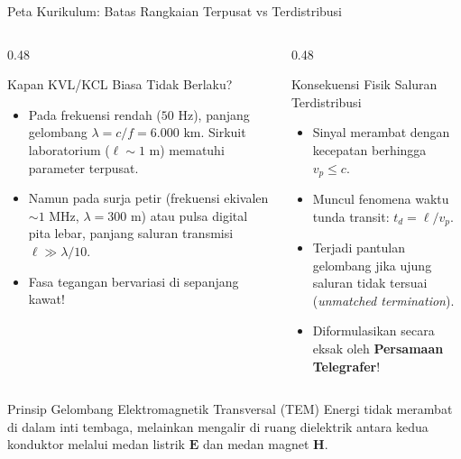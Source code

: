 \documentclass[aspectratio=169,10pt]{beamer}
\begin{document}
\begin{frame}{Peta Kurikulum: Batas Rangkaian Terpusat vs Terdistribusi}
  \begin{columns}[t]
    \begin{column}{0.48\textwidth}
      \begin{block}{Kapan KVL/KCL Biasa Tidak Berlaku?}
        \small
        \begin{itemize}
          \item Pada frekuensi rendah ($50\text{ Hz}$), panjang gelombang $\lambda = c/f = 6.000\text{ km}$. Sirkuit laboratorium ($\ell \sim 1\text{ m}$) mematuhi parameter terpusat.
          \item Namun pada surja petir (frekuensi ekivalen $\sim 1\text{ MHz}$, $\lambda = 300\text{ m}$) atau pulsa digital pita lebar, panjang saluran transmisi $\ell \gg \lambda / 10$.
          \item Fasa tegangan bervariasi di sepanjang kawat!
        \end{itemize}
      \end{block}
    \end{column}
    \begin{column}{0.48\textwidth}
      \begin{alertblock}{Konsekuensi Fisik Saluran Terdistribusi}
        \small
        \begin{itemize}
          \item Sinyal merambat dengan kecepatan berhingga $v_p \le c$.
          \item Muncul fenomena waktu tunda transit: $t_d = \ell / v_p$.
          \item Terjadi pantulan gelombang jika ujung saluran tidak tersuai (\textit{unmatched termination}).
          \item Diformulasikan secara eksak oleh \textbf{Persamaan Telegrafer}!
        \end{itemize}
      \end{alertblock}
    \end{column}
  \end{columns}
  \vspace{0.05cm}
  \begin{exampleblock}{Prinsip Gelombang Elektromagnetik Transversal (TEM)}
    \small
    Energi tidak merambat di dalam inti tembaga, melainkan mengalir di ruang dielektrik antara kedua konduktor melalui medan listrik $\mathbf{E}$ dan medan magnet $\mathbf{H}$.
  \end{exampleblock}
\end{frame}
\end{document}
